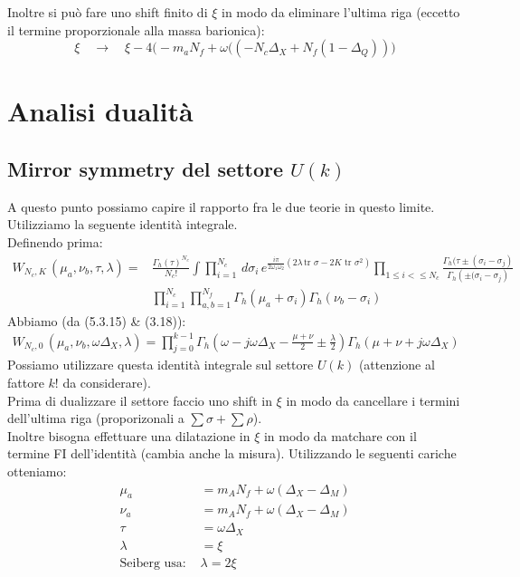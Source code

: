 \documentclass[a4paper,12pt]{article}
\begin{document}
Inoltre si può fare uno shift finito di $\xi$ in modo da eliminare l'ultima riga (eccetto il termine proporzionale alla massa barionica):
\begin{equation}
\xi \quad \longrightarrow \quad \xi - 4 \big( -m_a N_f + \omega ( ( -N_c \Delta_X + N_f ( 1 - \Delta_Q)) \big)
\end{equation}
 
\section{Analisi dualità}
\subsection{Mirror symmetry del settore $U(k)$}
A questo punto possiamo capire il rapporto fra le due teorie in questo limite.
Utilizziamo la seguente identità integrale.\\
Definendo prima:
\begin{align*}
W_{N_c , K } \, ( \mu_a, \nu_b , \tau, \lambda ) = & \frac{\Gamma_h (\tau)^{N_c}}{N_c !}
\int \prod_{i=1}^{N_c} \, d \sigma_i \, e^{ \frac{i \pi}{2 \omega_1 \omega_2} \left( 2 \lambda
\, \mbox{tr } \sigma - 2 K \mbox{ tr } \sigma^2 \right)} \prod_{1 \leq i < \leq N_c}
\frac{ \Gamma_h ( \tau \pm ( \sigma_i - \sigma_j) }{ \Gamma_h  \left( \pm (\sigma_i - \sigma_j \right) } \\
&  \prod_{i=1}^{N_c} \prod_{a,b=1}^{N_f} \Gamma_h ( \mu_a + \sigma_i) \Gamma_h(\nu_b- \sigma_i)
\end{align*}
Abbiamo (da \citep{vanDeBult:2007}(5.3.15) \& \citep{Amariti:2014iza}(3.18)):
\begin{align}
W_{N_c , 0 } \, ( \mu_a, \nu_b , \omega \Delta_X, \lambda )  = \prod_{j=0}^{k-1} \Gamma_h \left( \omega  - j \omega \Delta_X  - \frac{\mu+\nu}{2} \pm \frac{\lambda}{2} \right)
\Gamma_h \left( \mu + \nu + j \omega \Delta_X \right)
\label{dualization-mirror}
\end{align}
Possiamo utilizzare questa identità integrale sul settore $ U(k)$ (attenzione al fattore $k!$ da considerare).\\
Prima di dualizzare il settore faccio uno shift in $\xi$ in modo da cancellare i termini dell'ultima riga (proporizonali a $ \sum \sigma + \sum \rho$).\\
Inoltre bisogna effettuare una dilatazione in $\xi$ in modo da matchare con il termine FI dell'identità (cambia anche la misura).
Utilizzando le seguenti cariche otteniamo:
\begin{align*}
	\mu_a & =  m_A N_f + \omega( \Delta_X - \Delta_M ) \\
	\nu_a  &=  m_A N_f + \omega( \Delta_X -\Delta_M )\\
	\tau  & =  \omega \Delta_X  \\
	\lambda & = \xi\\
	\mbox{Seiberg usa: } & \lambda = 2 \xi
\end{align*}
\end{document}
